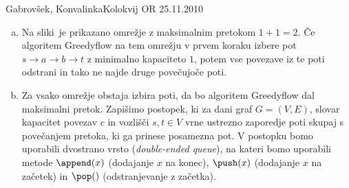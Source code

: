 \begin{naloga}{Gabrovšek, Konvalinka}{Kolokvij OR 25.11.2010}
\begin{odgovor}
\begin{enumerate}[(a)]
\item Na sliki~
je prikazano omrežje z maksimalnim pretokom $1+1 = 2$.
Če algoritem {\sc Greedyflow} na tem omrežju
v prvem koraku izbere pot $s \to a \to b \to t$ z minimalno kapaciteto $1$,
potem vse povezave iz te poti odstrani in tako ne najde druge povečujoče poti.

\item Za vsako omrežje obstaja izbira poti,
da bo algoritem {\sc Greedyflow} dal maksimalni pretok.
Zapišimo postopek, ki za dani graf $G = (V, E)$,
slovar kapacitet povezav $c$ in vozlišči $s, t \in V$
vrne ustrezno zaporedje poti skupaj s povečanjem pretoka,
ki ga prinese posamezna pot.
V postopku bomo uporabili dvostrano vrsto ({\em double-ended queue}),
na kateri bomo uporabili metode $\append(x)$ (dodajanje $x$ na konec),
$\push(x)$ (dodajanje $x$ na začetek) in $\pop()$ (odstranjevanje z začetka).


\end{enumerate}
\end{odgovor}
\end{naloga}
